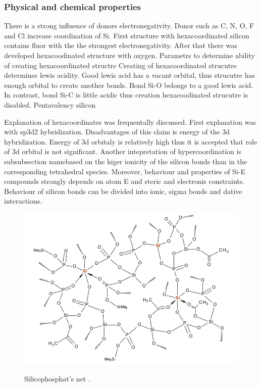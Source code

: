 \documentclass[
  digital, %
  table,   %
  lof,     %
  lot,     %
]{fithesis3}
\begin{document}
\subsubsection{Physical and chemical properties}
There is a strong influence of donors electronegativity.  Donor such as C, N, O, F and Cl increase coordination of Si. First structure with hexacoordinated silicon contains fluor with the the strongest electronegativity. After that there was developed hexacoodinated structure with oxygen. Parametrs to determine ability of creating hexacoordinated structre
Creating of hexacoordinated strucutre determines lewis acidity. Good lewis acid has a vacant orbital, thus strucutre has enough orbital to create another bonds. Bond Si-O belongs to a good lewis acid. In contrast, bond Si-C is little acidic thus creation hexacoodinated strucutre is disabled. Pentavalency silicon




 Explanation of hexacoordinates was frequentally discussed. First explanation was with sp3d2 hybridization. Disadvantages of this claim is energy of the 3d hybridization. Energy of 3d orbitaly is relatively high thus it is accepted that role of 3d orbital is not significant.
 Another intepretation of hypercoordination is subsubsection namebased on the higer ionicity of the silicon bonds than in the corresponding tetrahedral species. Moreover, behaviour and properties of Si-E compounds strongly depends on atom E and steric and electronis constraints. Behaviour of silicon bonds can be divided into ionic, sigma bonds and dative interactions.





\begin{figure}[h!]
\caption{Silicophosphat's net \cite{Styskalik2015thesis}. }
  \center
  \includegraphics[width=12cm]{si_polymer_cely.png}
  \label{si_polymer_cely}
  \end{figure}
\end{document}
